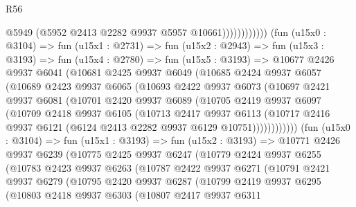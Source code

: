 \begin{lexlean}{R56}
\begin{coremodule}
                              @5949
                              (@5952 @2413 @2282 @9937 @5957 @10661))))))))))))
        (fun (u15x0 : @3104) =>
        fun (u15x1 : @2731) =>
        fun (u15x2 : @2943) =>
        fun (u15x3 : @3193) =>
        fun (u15x4 : @2780) =>
        fun (u15x5 : @3193) =>
        @10677
          @2426
          @9937
          @6041
          (@10681
            @2425
            @9937
            @6049
            (@10685
              @2424
              @9937
              @6057
              (@10689
                @2423
                @9937
                @6065
                (@10693
                  @2422
                  @9937
                  @6073
                  (@10697
                    @2421
                    @9937
                    @6081
                    (@10701
                      @2420
                      @9937
                      @6089
                      (@10705
                        @2419
                        @9937
                        @6097
                        (@10709
                          @2418
                          @9937
                          @6105
                          (@10713
                            @2417
                            @9937
                            @6113
                            (@10717
                              @2416
                              @9937
                              @6121
                              (@6124 @2413 @2282 @9937 @6129 @10751))))))))))))
        (fun (u15x0 : @3104) =>
        fun (u15x1 : @3193) =>
        fun (u15x2 : @3193) =>
        @10771
          @2426
          @9937
          @6239
          (@10775
            @2425
            @9937
            @6247
            (@10779
              @2424
              @9937
              @6255
              (@10783
                @2423
                @9937
                @6263
                (@10787
                  @2422
                  @9937
                  @6271
                  (@10791
                    @2421
                    @9937
                    @6279
                    (@10795
                      @2420
                      @9937
                      @6287
                      (@10799
                        @2419
                        @9937
                        @6295
                        (@10803
                          @2418
                          @9937
                          @6303
                          (@10807
                            @2417
                            @9937
                            @6311

\end{coremodule}
\end{lexlean}
